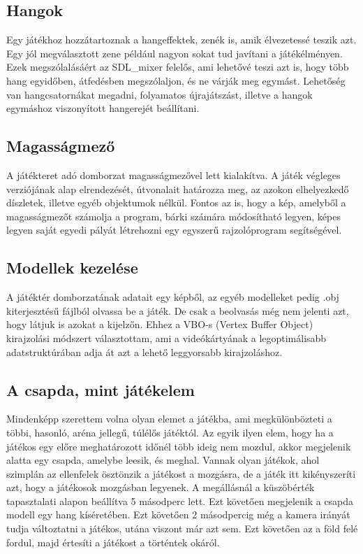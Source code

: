 \subsection{Hangok}

Egy játékhoz hozzátartoznak a hangeffektek, zenék is, amik élvezetessé teszik azt. Egy jól megválasztott zene például nagyon sokat tud javítani a játékélményen. Ezek megszólalásáért az SDL\_mixer felelős, ami lehetővé teszi azt is, hogy több hang egyidőben, átfedésben megszólaljon, és ne várják meg egymást. Lehetőség van hangcsatornákat megadni, folyamatos újrajátszást, illetve a hangok egymáshoz viszonyított hangerejét beállítani.

\subsection{Magasságmező}

A játékteret adó domborzat magasságmezővel lett kialakítva. A játék végleges verziójának alap elrendezését, útvonalait határozza meg, az azokon elhelyezkedő díszletek, illetve egyéb objektumok nélkül. Fontos az is, hogy a kép, amelyből a magasságmezőt számolja a program, bárki számára módosítható legyen, képes legyen saját egyedi pályát létrehozni egy egyszerű rajzolóprogram segítségével.

\subsection{Modellek kezelése}

A játéktér domborzatának adatait egy képből, az egyéb modelleket pedig .obj kiterjesztésű fájlból olvassa be a játék. De csak a beolvasás még nem jelenti azt, hogy látjuk is azokat a kijelzőn. Ehhez a VBO-s (Vertex Buffer Object) kirajzolási módszert választottam, ami a videókártyának a legoptimálisabb adatstruktúrában adja át azt a lehető leggyorsabb kirajzoláshoz.

\subsection{A csapda, mint játékelem}

Mindenképp szerettem volna olyan elemet a játékba, ami megkülönbözteti a többi, hasonló, aréna jellegű, túlélős játéktól. Az egyik ilyen elem, hogy ha a játékos egy előre meghatározott időnél több ideig nem mozdul, akkor megjelenik alatta egy csapda, amelybe leesik, és meghal. Vannak olyan játékok, ahol szimplán az ellenfelek ösztönzik a játékost a mozgásra, de a játék itt kikényszeríti azt, hogy a játékosok mozgásban legyenek. A megállásnál a küszöbérték tapasztalati alapon beállítva 5 másodperc lett. Ezt követően megjelenik a csapda modell egy hang kíséretében. Ezt követően 2 másodpercig még a kamera irányát tudja változtatni a játékos, utána viszont már azt sem. Ezt követően az a föld felé fordul, majd értesíti a játékost a történtek okáról.

